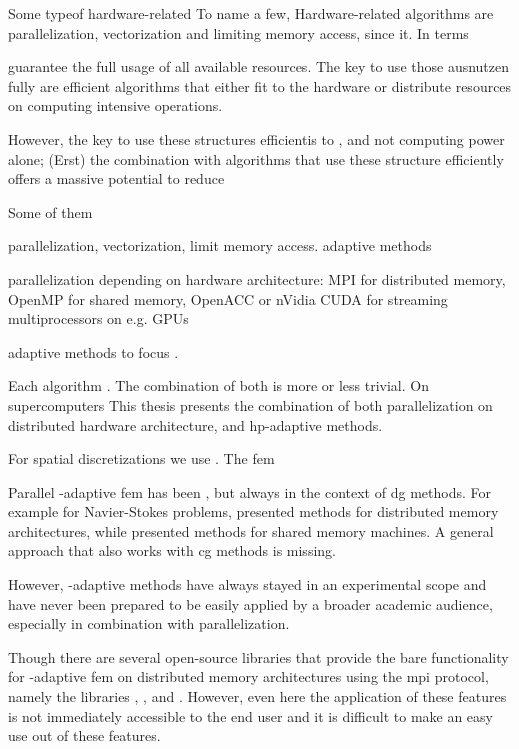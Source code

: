 Some typeof hardware-related 
To name a few, Hardware-related algorithms are parallelization, vectorization and limiting memory access, since it. In terms 


guarantee the full usage of all available resources. The key to use those ausnutzen fully are efficient algorithms that either fit to the hardware or distribute resources on computing intensive operations.

However, the key to use these structures efficientis to , and not computing power alone; (Erst) the combination with algorithms that use these structure efficiently offers a massive potential to reduce 




Some of them

parallelization, vectorization, limit memory access. adaptive methods

parallelization depending on hardware architecture: MPI for distributed memory, OpenMP for shared memory, OpenACC or nVidia CUDA for streaming multiprocessors on e.g. GPUs

adaptive methods to focus .


Each algorithm . The combination of both is more or less trivial.
On supercomputers
This thesis presents the combination of both parallelization on distributed hardware architecture, and hp-adaptive methods.

For spatial discretizations we use . The \gls{fem}


Parallel \hp-adaptive \gls{fem} has been , but always in the context of \gls{dg} methods. For example for Navier-Stokes problems, \textcite{chalmers2019} presented methods for distributed memory architectures, while \textcite{paszynski2011} presented methods for shared memory machines. A general approach that also works with \gls{cg} methods is missing.

However, \hp-adaptive methods have always stayed in an experimental scope and have never been prepared to be easily applied by a broader academic audience, especially in combination with parallelization.

Though there are several open-source libraries that provide the bare functionality for \hp-adaptive \gls{fem} on distributed memory architectures using the \gls{mpi} protocol, namely the libraries \phaml{} \parencites{mitchell2002}{phaml1200}, \phg{} \parencites{zhanglin-bo2019}{phg094}, and \mofem{} \parencites{kaczmarczyk2020}{mofem090}. However, even here the application of these features is not immediately accessible to the end user and it is difficult to make an easy use out of these features.

